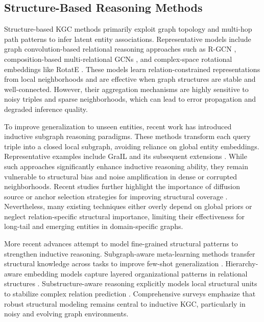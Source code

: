 \documentclass[preprint,12pt]{elsarticle}
\begin{document}
\subsection{Structure-Based Reasoning Methods}

Structure-based KGC methods primarily exploit graph topology and multi-hop path patterns to infer latent entity associations. Representative models include graph convolution-based relational reasoning approaches such as R-GCN \cite{schlichtkrull}, composition-based multi-relational GCNs \cite{composition-gcn}, and complex-space rotational embeddings like RotatE \cite{rotatE}. These models learn relation-constrained representations from local neighborhoods and are effective when graph structures are stable and well-connected. However, their aggregation mechanisms are highly sensitive to noisy triples and sparse neighborhoods, which can lead to error propagation and degraded inference quality.

To improve generalization to unseen entities, recent work has introduced inductive subgraph reasoning paradigms. These methods transform each query triple into a closed local subgraph, avoiding reliance on global entity embeddings. Representative examples include GraIL \cite{subgraph-inductive-2020} and its subsequent extensions \cite{cmp,topology-aware,reinception}. While such approaches significantly enhance inductive reasoning ability, they remain vulnerable to structural bias and noise amplification in dense or corrupted neighborhoods. Recent studies further highlight the importance of diffusion source or anchor selection strategies for improving structural coverage \cite{anchors-inc,nodepiece,clustering-prop,query-anchor}. Nevertheless, many existing techniques either overly depend on global priors or neglect relation-specific structural importance, limiting their effectiveness for long-tail and emerging entities in domain-specific graphs.

More recent advances attempt to model fine-grained structural patterns to strengthen inductive reasoning. Subgraph-aware meta-learning methods transfer structural knowledge across tasks to improve few-shot generalization \cite{meta-subgraph}. Hierarchy-aware embedding models capture layered organizational patterns in relational structures \cite{hierarchy-aware}. Substructure-aware reasoning explicitly models local structural units to stabilize complex relation prediction \cite{substructure-aware}. Comprehensive surveys \cite{survey-ikgc} emphasize that robust structural modeling remains central to inductive KGC, particularly in noisy and evolving graph environments.
\end{document}
